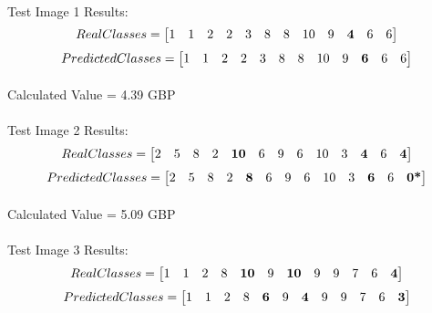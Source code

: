 \documentclass[11pt]{article}
\begin{document}
\paragraph{}
Test Image 1 Results:
\[
Real Classes = 
	\setcounter{MaxMatrixCols}{12}
	\begin{bmatrix}
	1 & 1 & 2 & 2 & 3 & 8 & 8 & 10 & 9 & \textbf{4} & 6 & 6\\
	\end{bmatrix}
\]
\[
Predicted Classes = 
	\setcounter{MaxMatrixCols}{12}
	\begin{bmatrix}
	 1 & 1 & 2 & 2 & 3 & 8 & 8 & 10 & 9 & \textbf{6} & 6 & 6\\
	\end{bmatrix}
\]
\paragraph{}
Calculated Value = 4.39 GBP
\paragraph{}
\paragraph{}
Test Image 2 Results:
\[
Real Classes = 
	\setcounter{MaxMatrixCols}{13}
	\begin{bmatrix}
	2 & 5 & 8 & 2 & \textbf{10} & 6 & 9 & 6 & 10 & 3 & \textbf{4} & 6 & \textbf{4}\\
	\end{bmatrix}
\]
\[
Predicted Classes = 
	\setcounter{MaxMatrixCols}{13}
	\begin{bmatrix}
	 2   &  5 &    8 &    2   &  \textbf{8} &    6  &   9  &   6  &  10 & 3  & \textbf{6} &    6  & \textbf{0*}\\
	\end{bmatrix}
\]
\paragraph{}
Calculated Value = 5.09 GBP
\paragraph{}
\paragraph{}
Test Image 3 Results:
\[
Real Classes = 
	\setcounter{MaxMatrixCols}{12}
	\begin{bmatrix}
	1 & 1 & 2 & 8 & \textbf{10} & 9 & \textbf{10} & 9 & 9 & 7 & 6 & \textbf{4}\\
	\end{bmatrix}
\]
\[
Predicted Classes = 
	\setcounter{MaxMatrixCols}{12}
	\begin{bmatrix}
	 1 & 1 & 2 & 8 & \textbf{6} & 9 & \textbf{4} & 9 & 9 & 7 & 6 & \textbf{3}\\
	\end{bmatrix}
\]
\end{document}
